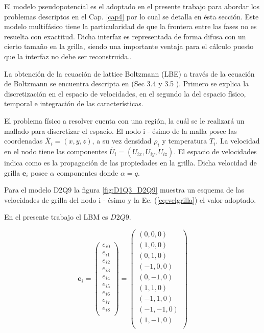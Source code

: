 El modelo pseudopotencial es el adoptado en el presente trabajo para abordar los problemas descriptos en el Cap. \ref{cap4} por lo cual se detalla en ésta sección. Este modelo multifásico tiene la particularidad de que la frontera entre las fases no es resuelta con exactitud. Dicha interfaz es representada de forma difusa con un cierto tamaño en la grilla, siendo una importante ventaja para el cálculo puesto que la interfaz no debe ser reconstruida.\cite{parrill2019reviews}.


La obtención de la ecuación de lattice Boltzmann (LBE) a través de la ecuación de Boltzmann se encuentra descripta en \cite{kruger2017lattice} (Sec 3.4 y 3.5 ). Primero se explica la discretización en el espacio de velocidades, en el segundo la del espacio físico, temporal e integración de las características.


El problema físico a resolver cuenta con una región, la cuál se le realizará un mallado para discretizar el espacio. El nodo i - ésimo de la malla posee las coordenadas ${\bar{X}}_{i} = (x,y,z)$, a su vez densidad $\rho_{i}$ y temperatura $T_{i}$. La velocidad en el nodo tiene las componentes ${\bar{U}}_{i} = ({U}_{ix},{U}_{iy},{U}_{iz})$. El espacio de velocidades indica como es la propagación de las propiedades en la grilla. Dicha velocidad de grilla $\mathbf{e}_{i}$ posee $\alpha$ componentes donde $\alpha = q $. 

Para el modelo D2Q9 la figura \ref{fig:D1Q3_D2Q9} muestra un esquema de las velocidades de grilla del nodo i - ésimo y la Ec. (\ref{eq:velgrilla}) el valor adoptado.

En el presente trabajo el LBM es $D2Q9$. 


\begin{equation}
    {\mathbf{e}}_{i} =  
    \left( \begin{array}{c} 
                e_{i0} \\ e_{i1}\\ e_{i2}\\ e_{i3}\\ e_{i4}\\ e_{i5}\\
                e_{i6}\\ e_{i7}\\ e_{i8}\\
            \end{array}
    \right) =
    \left( \begin{array}{c} 
        (0,0,0) \\ (1,0,0) \\ (0,1,0) \\(-1,0,0) \\ (0,-1,0) \\ (1,1,0) \\
        (-1,1,0) \\ (-1,-1,0) \\ (1,-1,0)\\ 
    \end{array}
    \right) 
    \label{eq:velgrilla}
\end{equation}

